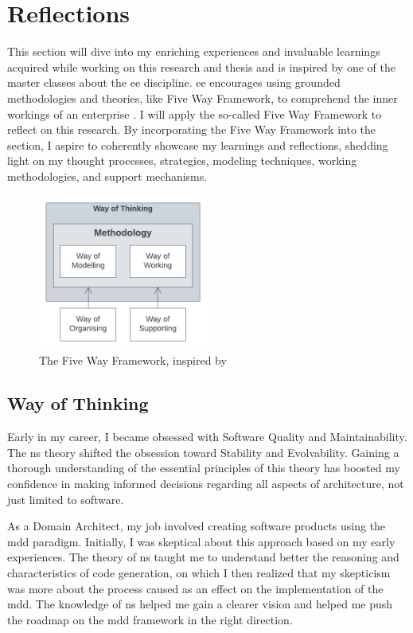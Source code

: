 \section{Reflections} \label{chap_reflection}

This section will dive into my enriching experiences and invaluable learnings acquired
while working on this research and thesis and is inspired by one of the master classes
about the \gls{ee} discipline. \gls{ee} encourages using grounded methodologies and
theories, like Five Way Framework, to comprehend the inner workings of an enterprise
\parencite[262]{dietz_enterprise_2020}. I will apply the so-called Five Way Framework to
reflect on this research. By incorporating the Five Way Framework into the section, I
aspire to coherently showcase my learnings and reflections, shedding light on my thought
processes, strategies, modeling techniques, working methodologies, and support mechanisms.

\begin{figure}[H]
    \centering
    \includegraphics[width=0.5\textwidth]{figures/5ways.pdf}
    \caption[The Five Way Framework]{The Five Way Framework, inspired by \textcite{dietz_enterprise_2020}}
    \label{fig_5ways}
\end{figure}

\subsection{Way of Thinking}

Early in my career, I became obsessed with Software Quality and Maintainability. The
\gls{ns} theory shifted the obsession toward Stability and Evolvability. Gaining a
thorough understanding of the essential principles of this theory has boosted my
confidence in making informed decisions regarding all aspects of architecture, not just
limited to software.

As a Domain Architect, my job involved creating software products using the \gls{mdd}
paradigm. Initially, I was skeptical about this approach based on my early experiences.
The theory of \gls{ns} taught me to understand better the reasoning and characteristics of
code generation, on which I then realized that my skepticism was more about the process
caused as an effect on the implementation of the \gls{mdd}. The knowledge of \gls{ns}
helped me gain a clearer vision and helped me push the roadmap on the \gls{mdd} framework
in the right direction.

